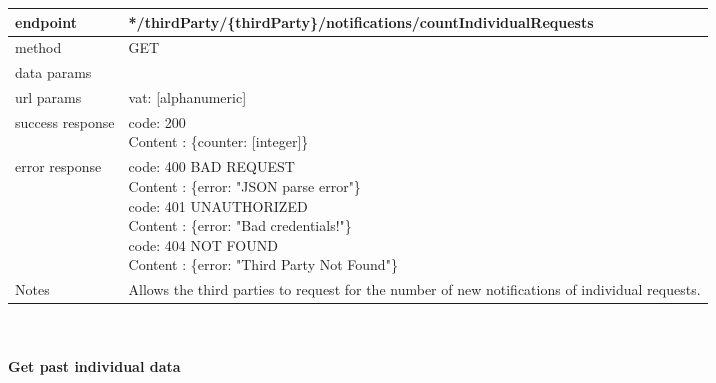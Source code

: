 \begin{legal}
\begin{legal}
\begin{itemize}
								\begin{tabularx}{\linewidth}{| l| l }
									\hline
									endpoint & */thirdParty/\{thirdParty\}/notifications/countIndividualRequests \\
									\hline
									method & GET \\
									\hline
									data params & \\
									\hline
									url params &
									\parbox{0.7\textwidth}{
										\bigskip
										vat: [alphanumeric]
										\bigskip
									} \\
									\hline
									success response &
									\parbox{0.7\textwidth}{
										\bigskip
										code: 200\\
										Content : \{counter: [integer]\}
										\bigskip
									} \\
									\hline
									error response &
									\parbox{0.7\textwidth}{
										\bigskip
										code: 400 BAD REQUEST \\
										Content : \{error: "JSON parse error"\}\\
										code: 401 UNAUTHORIZED \\
										Content : \{error: "Bad credentials!"\}\\
										code: 404 NOT FOUND \\
										Content : \{error: "Third Party Not Found"\}
										\bigskip
									} \\
									\hline
									Notes & 
									\parbox{0.7\textwidth}{
										\bigskip Allows the third parties to request for the number of new notifications of individual requests.
									\bigskip}  \\
									\hline
								\end{tabularx}\\\\
								
								\textbf{Get past individual data} \\
			

\end{itemize}
\end{legal}
\end{legal}
